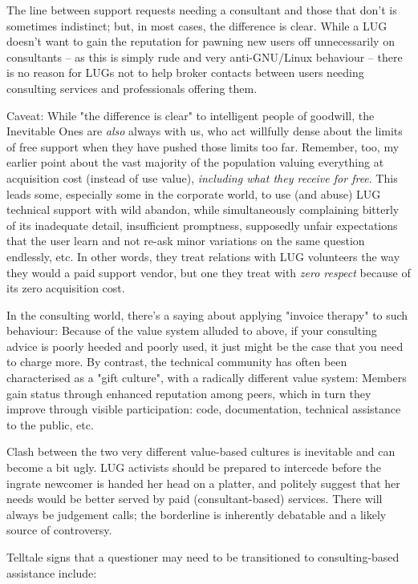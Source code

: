 The line between support requests needing a consultant and those
that don't is sometimes indistinct; but, in most cases, the difference
is clear. While a LUG doesn't want to gain the reputation for
pawning new users off unnecessarily on consultants -- as this is simply
rude and very anti-GNU/Linux behaviour -- there is no reason for LUGs not to
help broker contacts between users needing consulting services and
professionals offering them.

Caveat:  While "the difference is clear" to intelligent people of goodwill,
the Inevitable Ones are {\itshape also\/} always with us, who act willfully
dense about the limits of free support when they have pushed those
limits too far.  Remember, too, my earlier point about the vast majority
of the population valuing everything at acquisition cost (instead of use
value), {\itshape including what they receive for free\/}.  This leads some,
especially some in the corporate world, to use (and abuse) LUG
technical support with wild abandon, while simultaneously complaining
bitterly of its inadequate detail, insufficient promptness, supposedly
unfair expectations that the user learn and not re-ask minor variations on
the same question endlessly, etc.  In other words, they treat relations
with LUG volunteers the way they would a paid support vendor, but one
they treat with {\itshape zero respect\/} because of its zero acquisition
cost.

In the consulting world, there's a saying about applying "invoice therapy" 
to such behaviour:  Because of the value system alluded to above, if
your consulting advice is poorly heeded and poorly used, it just might
be the case that you need to charge more.  By contrast, the technical
community has often been characterised as a "gift culture", with a
radically different value system: Members gain status through enhanced
reputation among peers, which in turn they improve through visible
participation:  code, documentation, technical assistance to the public,
etc.

Clash between the two very different value-based cultures is inevitable
and can become a bit ugly.  LUG activists should be prepared to intercede
before the ingrate newcomer is handed her head on a platter, and
politely suggest that her needs would be better served by paid
(consultant-based) services.  There will always be judgement calls;
the borderline is inherently debatable and a likely source of
controversy.

Telltale signs that a questioner may need to be transitioned to consulting-based assistance include:

